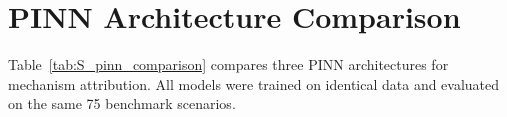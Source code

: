 \documentclass[5p,times,authoryear]{elsarticle}
\begin{document}
\section{PINN Architecture Comparison}
\label{sec:S_pinn_comparison}

Table~\ref{tab:S_pinn_comparison} compares three PINN architectures for mechanism attribution. All models were trained on identical data and evaluated on the same 75 benchmark scenarios.

\begin{table}[!htb]
\caption{Performance comparison across three PINN architectures for degradation mechanism attribution. The Hybrid PINN achieves the highest overall accuracy at 96.0\%, with per-mechanism accuracies showing strong detection across all five degradation modes.}
\centering
{}
\label{tab:S_pinn_comparison}
\end{table}


\end{document}
